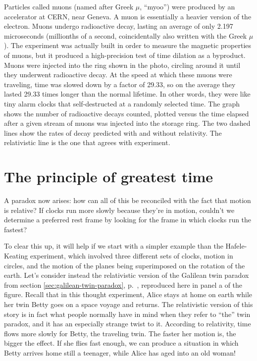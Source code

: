 \begin{figure}[h]\label{fig:cern-muons}
\end{figure}

Particles called muons (named after Greek $\mu$, ``myoo'') were produced by an
accelerator at CERN, near Geneva. A muon is essentially a heavier version
of the electron. Muons undergo radioactive decay,
lasting an average of only 2.197 microseconds (millionths of a second, coincidentally also written with the Greek $\mu$).
The experiment was actually built in order to measure the magnetic properties of muons, but it produced a high-precision
test of time dilation as a byproduct.
Muons were injected into the ring shown in the photo, circling around it until
they underwent radioactive decay.
At the speed at which these muons were traveling, time was slowed down by
a factor of 29.33, so on the average they lasted 29.33 times
longer than the normal lifetime. In other words, they were like tiny alarm clocks that self-destructed at a randomly
selected time. The graph shows the number of radioactive decays counted, plotted versus the
time elapsed after a given stream of muons was injected into the storage ring. The two dashed lines show the rates
of decay predicted with and without relativity. The relativistic line is the one that agrees with experiment.

\section{The principle of greatest time}


A paradox now arises: how can all of this be reconciled with the fact that motion is relative?
If clocks run more slowly because they're in motion, couldn't we determine a preferred rest frame
by looking for the frame in which clocks run the fastest?

\begin{figure}\label{fig:twin-paradox}
\end{figure}

To clear this up, it will help if we start with
a simpler example than the Hafele-Keating experiment, which involved three different sets of clocks, motion
in circles, and the motion of the planes being superimposed on the rotation of the earth.
Let's consider instead the relativistic version of the Galilean twin paradox from section
\ref{sec:galilean-twin-paradox}, p.~\pageref{sec:galilean-twin-paradox}, reproduced here in
panel a of the figure. Recall that in this thought
experiment, Alice stays at home on earth while her twin Betty goes on a space voyage and returns. The relativistic version
of this story
is in fact what people normally have in mind when they refer to ``the'' twin paradox, and it has an especially
strange twist to it. According to relativity, time flows more slowly for Betty, the traveling twin.
The faster her motion is, the bigger the effect. If she flies fast enough, we can produce a situation
in which Betty arrives home still a teenager, while Alice has aged into an old woman!

